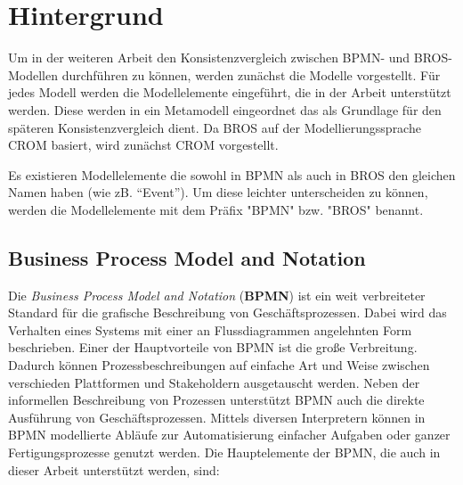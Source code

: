 \chapter{Hintergrund}
\label{chap:background}

Um in der weiteren Arbeit den Konsistenzvergleich zwischen BPMN- und BROS-Modellen durchführen zu können, werden zunächst die Modelle vorgestellt.
Für jedes Modell werden die Modellelemente eingeführt, die in der Arbeit unterstützt werden.
Diese werden in ein Metamodell eingeordnet das als Grundlage für den späteren Konsistenzvergleich dient.
Da BROS auf der Modellierungssprache CROM basiert, wird zunächst CROM vorgestellt.

Es existieren Modellelemente die sowohl in BPMN als auch in BROS den gleichen Namen haben (wie zB. ``Event'').
Um diese leichter unterscheiden zu können, werden die Modellelemente mit dem Präfix "BPMN" bzw. "BROS" benannt.

\section{Business Process Model and Notation}

Die \emph{Business Process Model and Notation} (\textbf{BPMN}) ist ein weit verbreiteter Standard für die grafische Beschreibung von Geschäftsprozessen.
Dabei wird das Verhalten eines Systems mit einer an Flussdiagrammen angelehnten Form beschrieben.
Einer der Hauptvorteile von BPMN ist die große Verbreitung.
Dadurch können Prozessbeschreibungen auf einfache Art und Weise zwischen verschieden Plattformen und Stakeholdern ausgetauscht werden.
Neben der informellen Beschreibung von Prozessen unterstützt BPMN auch die direkte Ausführung von Geschäftsprozessen.
Mittels diversen Interpretern können in BPMN modellierte Abläufe zur Automatisierung einfacher Aufgaben oder ganzer Fertigungsprozesse genutzt werden.
Die Hauptelemente der BPMN, die auch in dieser Arbeit unterstützt werden, sind:


